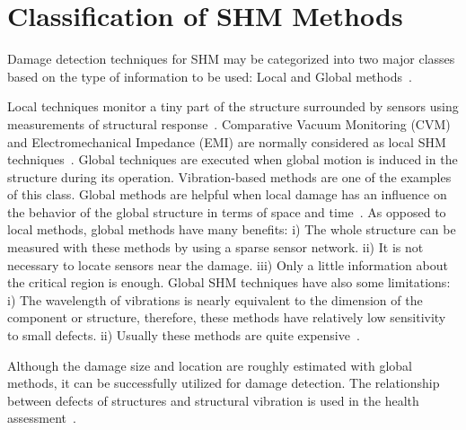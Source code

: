 \documentclass[b5paper, 11pt, titlepage]{book}
\begin{document}
\section{Classification of SHM Methods}
Damage detection techniques for SHM may be categorized into two major classes based on the type of information to be used: Local and Global methods~\cite{lee2008overview, stepinski2013advanced}. 

Local techniques monitor a tiny part of the structure surrounded by sensors using measurements of structural response~\cite{lee2008overview, stepinski2013advanced}. Comparative Vacuum Monitoring (CVM) and Electromechanical Imped\-ance (EMI) are normally considered as local SHM techniques~\cite{Guemes2020a, liang1997coupled, Fiborek2018}.
\newline Global techniques are executed when global motion is induced in the structure during its operation. Vibration-based methods are one of the examples of this class. Global methods are helpful when local damage has an influence on the behavior of the global structure in terms of space and time~\cite{lee2008overview, stepinski2013advanced}. 
As opposed to local methods, global methods have many benefits: 
\newline i) The whole structure can be measured with these methods by using a sparse sensor network.
\newline ii) It is not necessary to locate sensors near the damage.
\newline iii) Only a little information about the critical region is enough. 
Global SHM techniques have also some limitations: 
\newline i) The wavelength of vibrations is nearly equivalent to the dimension of the component or structure, therefore, these methods have relatively low sensitivity to small defects. 
\newline ii) Usually these methods are quite expensive~\cite{ stepinski2013advanced}.

Although the damage size and location are roughly estimated with global methods, it can be successfully utilized for damage detection. The relationship between defects of structures and structural vibration is used in the health assessment~\cite{stepinski2013advanced,Worden2007}. 
\end{document}
